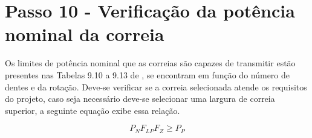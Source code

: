 \pagebreak

\section{Passo 10 - Verificação da potência nominal da correia}

Os limites de potência nominal que as correias são capazes de transmitir estão presentes nas Tabelas 9.10 a 9.13 de \cite{EMA_Barbieri}, se encontram em função do número de dentes e da rotação. Deve-se verificar se a correia selecionada atende os requisitos do projeto, caso seja necessário deve-se selecionar uma largura de correia superior, a seguinte equação exibe essa relação.

\begin{equation}
    P_N F_{LP} F_Z \geq P_P
\end{equation}